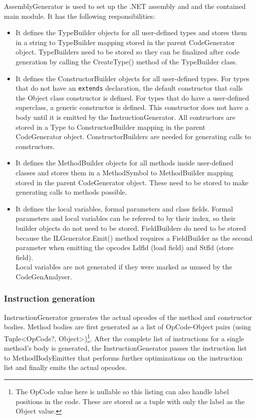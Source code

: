 \documentclass[a4paper,11pt]{article}
\begin{document}
AssemblyGenerator is used to set up the .NET assembly and and the contained main module. It has the following responsibilities:
\begin{itemize}
    \item It defines the TypeBuilder objects for all user-defined types and stores them in a string to TypeBuilder mapping stored in the parent CodeGenerator object. TypeBuilders need to be stored so they can be finalized after code generation by calling the CreateType() method of the TypeBuilder class.
    \item It defines the ConstructorBuilder objects for all user-defined types. For types that do not have an \verb,extends, declaration, the default constructor that calls the Object class constructor is defined. For types that do have a user-defined superclass, a generic constructor is defined. This constructor does not have a body until it is emitted by the InstructionGenerator. All contructors are stored in a Type to ConstructorBuilder mapping in the parent CodeGenerator object. ConstructorBuilders are needed for generating calls to constructors.
    \item It defines the MethodBuilder objects for all methods inside user-defined classes and stores them in a MethodSymbol to MethodBuilder mapping stored in the parent CodeGenerator object. These need to be stored to make generating calls to methods possible.
    \item It defines the local variables, formal parameters and class fields. Formal parameters and local variables can be referred to by their index, so their builder objects do not need to be stored. FieldBuilders do need to be stored because the ILGenerator.Emit() method requires a FieldBuilder as the second parameter when emitting the opcodes Ldfld (load field) and Stfld (store field). \\
        Local variables are not generated if they were marked as unused by the CodeGenAnalyser.
\end{itemize}

\subsubsection{Instruction generation}

InstructionGenerator generates the actual opcodes of the method and constructor bodies. Method bodies are first generated as a list of OpCode-Object pairs (using Tuple<OpCode?, Object>)\footnote{The OpCode value here is nullable so this listing can also handle label positions in the code. These are stored as a tuple with only the label as the Object value.}. After the complete list of instructions for a single method's body is generated, the InstructionGenerator passes the instruction list to MethodBodyEmitter that performs further optimizations on the instruction list and finally emits the actual opcodes.
\end{document}
